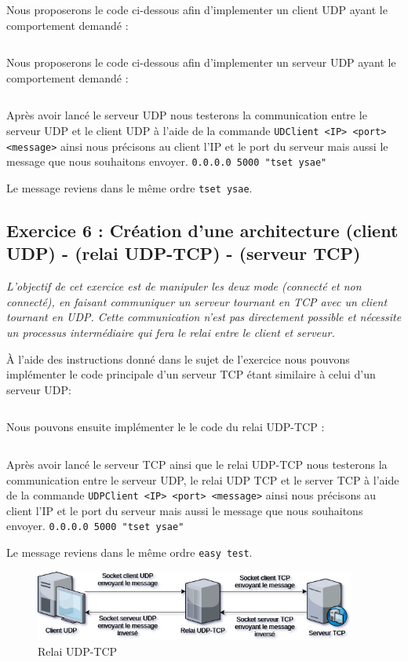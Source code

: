 Nous proposerons le code ci-dessous afin d'implementer un client UDP ayant le comportement demandé :
\inputminted[linenos,firstline=31, lastline=87]{cpp}{../sources/cpp/TP7-8/clientUDP.c}

Nous proposerons le code ci-dessous afin d'implementer un serveur UDP ayant le comportement demandé :
\inputminted[linenos,firstline=34, lastline=104]{cpp}{../sources/cpp/TP7-8/serveurUDP.c}

Après avoir lancé le serveur UDP nous testerons la communication entre le serveur UDP et le client UDP à l'aide de la commande \texttt{UDClient <IP> <port> <message>} ainsi nous précisons au client l'IP et le port du serveur mais aussi le message que nous souhaitons envoyer.
\texttt{0.0.0.0 5000 "tset ysae"}

Le message reviens dans le même ordre \texttt{tset ysae}.

\subsection{Exercice 6 : Création d’une architecture (client UDP) - (relai UDP-TCP) - (serveur TCP)}

\textit{L'objectif de cet exercice est de manipuler les deux mode (connecté et non connecté), en faisant communiquer un serveur tournant en TCP avec un client tournant en UDP. Cette communication n’est pas directement possible et nécessite un processus intermédiaire qui fera le relai entre le client et serveur.}

À l'aide des instructions donné dans le sujet de l'exercice nous pouvons implémenter le code principale d'un serveur TCP étant similaire à celui d'un serveur UDP:
\inputminted[linenos, firstline=34, lastline=104]{cpp}{../sources/cpp/TP7-8/serveurTCP.c}

Nous pouvons ensuite implémenter le le code du relai UDP-TCP :
\inputminted[linenos, firstline=34, lastline=104]{cpp}{../sources/cpp/TP7-8/relaiUDPTCP.c}

Après avoir lancé le serveur TCP ainsi que le relai UDP-TCP nous testerons la communication entre le serveur UDP, le relai UDP TCP et le server TCP à l'aide de la commande \texttt{UDPClient <IP> <port> <message>} ainsi nous précisons au client l'IP et le port du serveur mais aussi le message que nous souhaitons envoyer.
\texttt{0.0.0.0 5000 "tset ysae"}

Le message reviens dans le même ordre \texttt{easy test}.

\begin{figure}[H]
\centering
\includegraphics[width=300pt]{./cpp/Pictures/tp7+tp8-relay-UDP-TCP}
\caption{Relai UDP-TCP}
\label{Relai UDP-TCP}
\end{figure}

